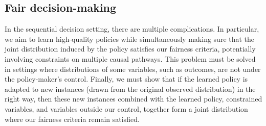 \documentclass{article}
\begin{document}


\subsection{Fair decision-making}

In the sequential decision setting, there are multiple complications.
In particular, we aim to learn high-quality policies while simultaneously making sure that the joint distribution induced by the 
policy satisfies our fairness criteria, potentially involving constraints on multiple causal pathways.  This problem must be solved in settings where distributions of some variables, such as outcomes, are not under the policy-maker's control.  Finally, we must show that if the learned policy is adapted to new instances (drawn from the original observed distribution) in the right way, then these new instances combined with the learned policy, constrained variables, and variables outside our control, together form a joint distribution where our fairness criteria remain satisfied.
\end{document}
